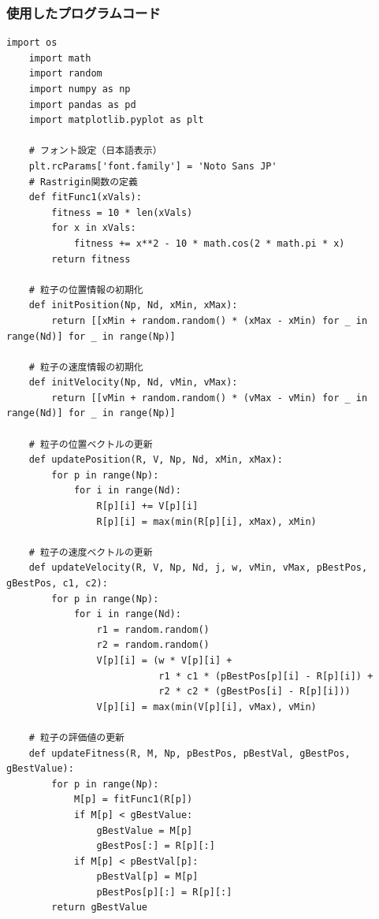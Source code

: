 \newpage
\subsubsection{使用したプログラムコード}
\begin{lstlisting}[caption=PSOにおける各種パラメータ設定の比較実験コード, label=lst:kadai2_code]
    import os
    import math
    import random
    import numpy as np
    import pandas as pd
    import matplotlib.pyplot as plt
    
    # フォント設定（日本語表示）
    plt.rcParams['font.family'] = 'Noto Sans JP'
    # Rastrigin関数の定義
    def fitFunc1(xVals):
        fitness = 10 * len(xVals)
        for x in xVals:
            fitness += x**2 - 10 * math.cos(2 * math.pi * x)
        return fitness
    
    # 粒子の位置情報の初期化
    def initPosition(Np, Nd, xMin, xMax):
        return [[xMin + random.random() * (xMax - xMin) for _ in range(Nd)] for _ in range(Np)]
    
    # 粒子の速度情報の初期化
    def initVelocity(Np, Nd, vMin, vMax):
        return [[vMin + random.random() * (vMax - vMin) for _ in range(Nd)] for _ in range(Np)]
    
    # 粒子の位置ベクトルの更新
    def updatePosition(R, V, Np, Nd, xMin, xMax):
        for p in range(Np):
            for i in range(Nd):
                R[p][i] += V[p][i]
                R[p][i] = max(min(R[p][i], xMax), xMin)
    
    # 粒子の速度ベクトルの更新
    def updateVelocity(R, V, Np, Nd, j, w, vMin, vMax, pBestPos, gBestPos, c1, c2):
        for p in range(Np):
            for i in range(Nd):
                r1 = random.random()
                r2 = random.random()
                V[p][i] = (w * V[p][i] +
                           r1 * c1 * (pBestPos[p][i] - R[p][i]) +
                           r2 * c2 * (gBestPos[i] - R[p][i]))
                V[p][i] = max(min(V[p][i], vMax), vMin)
    
    # 粒子の評価値の更新
    def updateFitness(R, M, Np, pBestPos, pBestVal, gBestPos, gBestValue):
        for p in range(Np):
            M[p] = fitFunc1(R[p])
            if M[p] < gBestValue:
                gBestValue = M[p]
                gBestPos[:] = R[p][:]
            if M[p] < pBestVal[p]:
                pBestVal[p] = M[p]
                pBestPos[p][:] = R[p][:]
        return gBestValue
    

\end{lstlisting}
